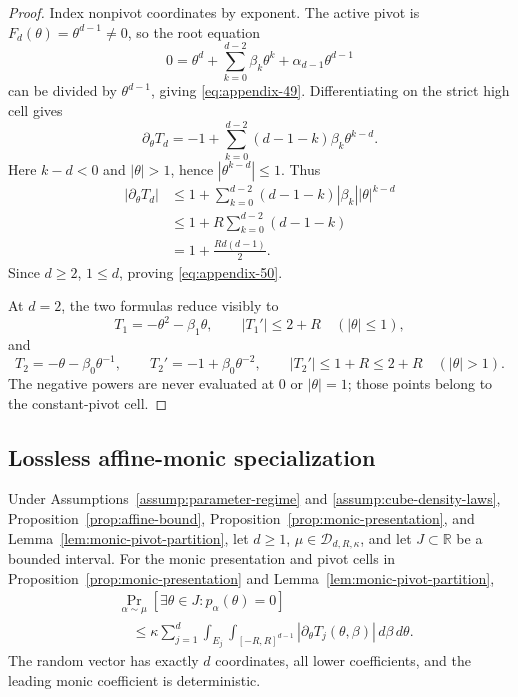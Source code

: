 \begin{proof}
Index nonpivot coordinates by exponent.  The active pivot is
$F_d(\theta)=\theta^{d-1}\neq0$, so the root equation
\[
0=\theta^d+\sum_{k=0}^{d-2}\beta_k\theta^k
 +\alpha_{d-1}\theta^{d-1}
\]
can be divided by $\theta^{d-1}$, giving \eqref{eq:appendix-49}.  Differentiating on the
strict high cell gives
\[
\partial_\theta T_d
=-1+\sum_{k=0}^{d-2}(d-1-k)\beta_k\theta^{k-d}.
\]
Here $k-d<0$ and $|\theta|>1$, hence $|\theta^{k-d}|\leq1$.  Thus
\[
\begin{aligned}
|\partial_\theta T_d|
&\leq1+\sum_{k=0}^{d-2}(d-1-k)
 |\beta_k||\theta|^{k-d}\\
&\leq1+R\sum_{k=0}^{d-2}(d-1-k)\\
&=1+\frac{Rd(d-1)}2.
\end{aligned}
\]
Since $d\geq2$, $1\leq d$, proving \eqref{eq:appendix-50}.

At $d=2$, the two formulas reduce visibly to
\[
T_1=-\theta^2-\beta_1\theta,
\qquad
|T_1'|\leq2+R
\quad(|\theta|\leq1),
\]
and
\[
T_2=-\theta-\beta_0\theta^{-1},
\qquad
T_2'=-1+\beta_0\theta^{-2},
\qquad
|T_2'|\leq1+R\leq2+R
\quad(|\theta|>1).
\]
The negative powers are never evaluated at $0$ or $|\theta|=1$; those
points belong to the constant-pivot cell.
\end{proof}

\subsection{Lossless affine-monic specialization}
\label{app:monic-specialization}

\begin{proposition}
\label{prop:monic-affine-transfer}
Under Assumptions~\ref{assump:parameter-regime} and
\ref{assump:cube-density-laws}, Proposition~\ref{prop:affine-bound},
Proposition~\ref{prop:monic-presentation}, and
Lemma~\ref{lem:monic-pivot-partition}, let $d\geq1$,
$\mu\in\mathcal D_{d,R,\kappa}$, and let $J\subset\mathbb R$ be a bounded
interval.  For the monic presentation and pivot cells in
Proposition~\ref{prop:monic-presentation} and
Lemma~\ref{lem:monic-pivot-partition},
\begin{equation}
\begin{aligned}
&\Pr_{\alpha\sim\mu}
[\exists\theta\in J:p_\alpha(\theta)=0]\\
&\quad\leq\kappa\sum_{j=1}^d
\int_{E_j}\int_{[-R,R]^{d-1}}
|\partial_\theta T_j(\theta,\beta)|\,d\beta\,d\theta.
\end{aligned}
\label{eq:appendix-51}
\end{equation}
The random vector has exactly $d$ coordinates, all lower coefficients, and
the leading monic coefficient is deterministic.
\end{proposition}

